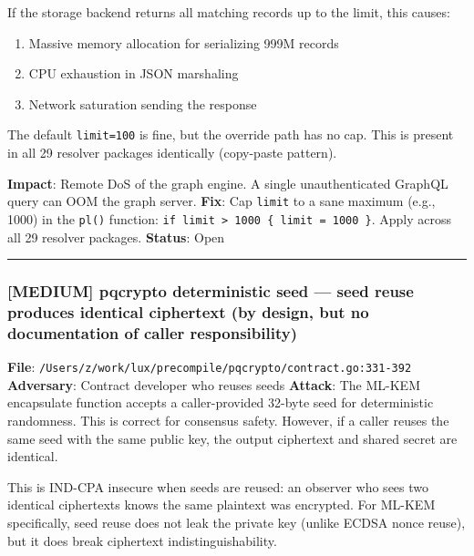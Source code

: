 \documentclass[
]{article}
\providecommand{\tightlist}{%
  \setlength{\itemsep}{0pt}\setlength{\parskip}{0pt}}
\begin{document}
If the storage backend returns all matching records up to the limit,
this causes:

\begin{enumerate}
\def\labelenumi{\arabic{enumi}.}
\tightlist
\item
  Massive memory allocation for serializing 999M records
\item
  CPU exhaustion in JSON marshaling
\item
  Network saturation sending the response
\end{enumerate}

The default \texttt{limit=100} is fine, but the override path has no
cap. This is present in all 29 resolver packages identically (copy-paste
pattern).

\textbf{Impact}: Remote DoS of the graph engine. A single
unauthenticated GraphQL query can OOM the graph server. \textbf{Fix}:
Cap \texttt{limit} to a sane maximum (e.g., 1000) in the \texttt{pl()}
function:
\texttt{if\ limit\ \textgreater{}\ 1000\ \{\ limit\ =\ 1000\ \}}. Apply
across all 29 resolver packages. \textbf{Status}: Open

\begin{center}\rule{0.5\linewidth}{0.5pt}\end{center}

\subsubsection{{[}MEDIUM{]} pqcrypto deterministic seed --- seed reuse
produces identical ciphertext (by design, but no documentation of caller
responsibility)}\label{medium-pqcrypto-deterministic-seed--seed-reuse-produces-identical-ciphertext-by-design-but-no-documentation-of-caller-responsibility}

\textbf{File}:
\texttt{/Users/z/work/lux/precompile/pqcrypto/contract.go:331-392}
\textbf{Adversary}: Contract developer who reuses seeds \textbf{Attack}:
The ML-KEM encapsulate function accepts a caller-provided 32-byte seed
for deterministic randomness. This is correct for consensus safety.
However, if a caller reuses the same seed with the same public key, the
output ciphertext and shared secret are identical.

This is IND-CPA insecure when seeds are reused: an observer who sees two
identical ciphertexts knows the same plaintext was encrypted. For ML-KEM
specifically, seed reuse does not leak the private key (unlike ECDSA
nonce reuse), but it does break ciphertext indistinguishability.
\end{document}
